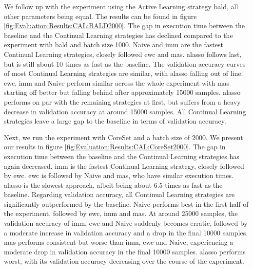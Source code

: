 We follow up with the experiment using the Active Learning strategy \gls{bald}, all other parameters being equal. The results can be found in figure \ref{fig:Evaluation:Results:CAL:BALD2000}. The gap in
execution time between the baseline and the Continual Learning strategies has declined compared to the experiment with \gls{bald} and batch size 1000. Naive and \gls{imm} are the fastest Continual Learning strategies,
closely followed \gls{ewc} and \gls{mas}. \gls{alasso} follows last, but is still about 10 times as fast as the baseline. The validation accuracy curves of most Continual Learning strategies are similar, with \gls{alasso} falling 
out of line. \gls{ewc}, \gls{imm} and Naive perform similar across the whole experiment with \gls{mas} starting off better but falling behind after approximately 15000 samples. \gls{alasso} performs on par with the remaining strategies
at first, but suffers from a heavy decrease in validation accuracy at around 15000 samples. All Continual Learning strategies leave a large gap to the baseline in terms of validation accuracy. \par

Next, we run the experiment with CoreSet and a batch size of 2000. We present our results in figure \ref{fig:Evaluation:Results:CAL:CoreSet2000}. The gap in execution time between the baseline and the
Continual Learning strategies has again decreased. \gls{imm} is the fastest Continual Learning strategy, closely followed by \gls{ewc}. \gls{ewc} is followed by Naive and \gls{mas}, who have similar execution times. \gls{alasso} is
the slowest approach, albeit being about 6.5 times as fast as the baseline. Regarding validation accuracy, all Continual Learning strategies are significantly outperformed by the baseline. Naive performs best
in the first half of the experiment, followed by \gls{ewc}, \gls{imm} and \gls{mas}. At around 25000 samples, the validation accuracy of \gls{imm}, \gls{ewc} and Naive suddenly becomes erratic, followed by a moderate increase in validation
accuracy and a drop in the final 10000 samples. \gls{mas} performs consistent but worse than \gls{imm}, \gls{ewc} and Naive, experiencing a moderate drop in validation accuracy in the final 10000 samples. \gls{alasso} performs worst,
with its validation accuracy decreasing over the course of the experiment. \par


